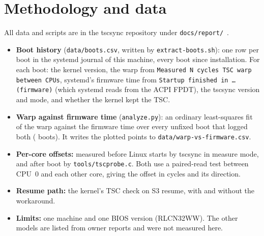 \documentclass[11pt,a4paper]{article}
\newcommand{\code}[1]{\texttt{#1}}
\begin{document}
\appendix
\section{Methodology and data}

All data and scripts are in the tscsync repository under
\code{docs/report/}~\cite{tscsync}.
\begin{itemize}
\item \textbf{Boot history} (\code{data/boots.csv}, written by
  \code{extract-boots.sh}): one row per boot in the systemd journal of this
  machine, every boot since installation. For each boot: the kernel version,
  the warp from \code{Measured N cycles TSC warp between CPUs}, systemd's
  firmware time from \code{Startup finished in \dots{} (firmware)} (which
  systemd reads from the ACPI FPDT), the tscsync version and mode, and
  whether the kernel kept the TSC.
\item \textbf{Warp against firmware time} (\code{analyze.py}): an ordinary
  least-squares fit of the warp against the firmware time over every unfixed
  boot that logged both (\fitpoints{} boots). It writes the plotted points to
  \code{data/warp-vs-firmware.csv}.
\item \textbf{Per-core offsets:} measured before Linux starts by tscsync in
  measure mode, and after boot by \code{tools/tscprobe.c}. Both use a
  paired-read test between CPU~0 and each other core, giving the offset in
  cycles and its direction.
\item \textbf{Resume path:} the kernel's TSC check on S3 resume, with and
  without the workaround.
\item \textbf{Limits:} one machine and one BIOS version (RLCN32WW). The other
  models are listed from owner reports and were not measured here.
\end{itemize}
\end{document}
